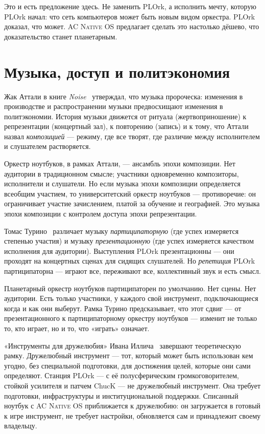\documentclass[10pt,letterpaper,twocolumn]{article}
\newcommand{\acos}{\textsc{AC Native OS}}
\begin{document}
Это и есть предложение здесь. Не заменить PLOrk, а исполнить мечту, которую PLOrk начал: что сеть компьютеров может быть новым видом оркестра. PLOrk доказал, что может. \acos{} предлагает сделать это настолько дёшево, что доказательство станет планетарным.


\section{Музыка, доступ и политэкономия}
\label{sec:theory}

Жак Аттали в книге \emph{Noise}~\citep{attali1985noise} утверждал, что музыка пророческа: изменения в производстве и распространении музыки предвосхищают изменения в политэкономии. История музыки движется от ритуала (жертвоприношение) к репрезентации (концертный зал), к повторению (запись) и к тому, что Аттали назвал \emph{композицией} --- режиму, где все творят, где различие между исполнителем и слушателем растворяется.

Оркестр ноутбуков, в рамках Аттали, --- ансамбль эпохи композиции. Нет аудитории в традиционном смысле; участники одновременно композиторы, исполнители и слушатели. Но если музыка эпохи композиции определяется всеобщим участием, то университетский оркестр ноутбуков --- противоречие: он ограничивает участие зачислением, платой за обучение и географией. Это музыка эпохи композиции с контролем доступа эпохи репрезентации.

Томас Турино~\citep{turino2008music} различает музыку \emph{партиципаторную} (где успех измеряется степенью участия) и музыку \emph{презентационную} (где успех измеряется качеством исполнения для аудитории). Выступления PLOrk презентационны --- они проходят на концертных сценах для сидящих слушателей. Но \emph{репетиция} PLOrk партиципаторна --- играют все, переживают все, коллективный звук и есть смысл.

Планетарный оркестр ноутбуков партиципаторен по умолчанию. Нет сцены. Нет аудитории. Есть только участники, у каждого свой инструмент, подключающиеся когда и как они выберут. Рамка Турино предсказывает, что этот сдвиг --- от презентационного к партиципаторному оркестру ноутбуков --- изменит не только то, кто играет, но и то, что «играть» означает.

«Инструменты для дружелюбия» Ивана Иллича~\citep{illich1973tools} завершают теоретическую рамку. Дружелюбный инструмент --- тот, который может быть использован кем угодно, без специальной подготовки, для достижения целей, которые они сами определяют. Станция PLOrk --- с её полусферическим громкоговорителем, стойкой усилителя и патчем ChucK --- не дружелюбный инструмент. Она требует подготовки, инфраструктуры и институциональной поддержки. Списанный ноутбук с \acos{} приближается к дружелюбию: он загружается в готовый к игре инструмент, не требует настройки, обновляется сам и принадлежит своему владельцу.
\end{document}
